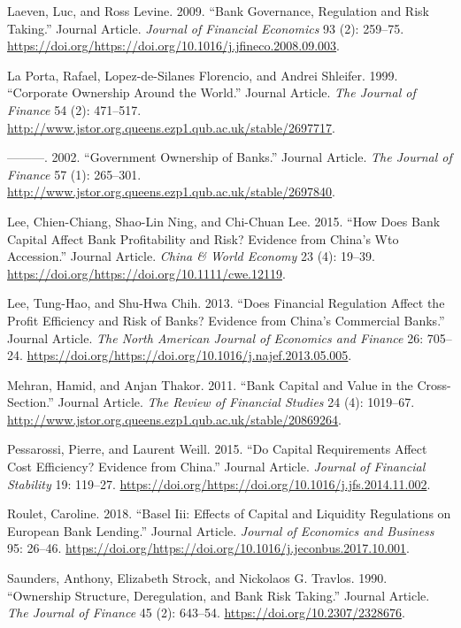 \documentclass{article}
\begin{document}
\leavevmode\hypertarget{ref-RN1}{}%
Laeven, Luc, and Ross Levine. 2009. ``Bank Governance, Regulation and
Risk Taking.'' Journal Article. \emph{Journal of Financial Economics} 93
(2): 259--75.
\url{https://doi.org/https://doi.org/10.1016/j.jfineco.2008.09.003}.

\leavevmode\hypertarget{ref-RN58}{}%
La Porta, Rafael, Lopez-de-Silanes Florencio, and Andrei Shleifer. 1999.
``Corporate Ownership Around the World.'' Journal Article. \emph{The
Journal of Finance} 54 (2): 471--517.
\url{http://www.jstor.org.queens.ezp1.qub.ac.uk/stable/2697717}.

\leavevmode\hypertarget{ref-RN59}{}%
---------. 2002. ``Government Ownership of Banks.'' Journal Article.
\emph{The Journal of Finance} 57 (1): 265--301.
\url{http://www.jstor.org.queens.ezp1.qub.ac.uk/stable/2697840}.

\leavevmode\hypertarget{ref-RN62}{}%
Lee, Chien-Chiang, Shao-Lin Ning, and Chi-Chuan Lee. 2015. ``How Does
Bank Capital Affect Bank Profitability and Risk? Evidence from China's
Wto Accession.'' Journal Article. \emph{China \& World Economy} 23 (4):
19--39. \url{https://doi.org/https://doi.org/10.1111/cwe.12119}.

\leavevmode\hypertarget{ref-RN63}{}%
Lee, Tung-Hao, and Shu-Hwa Chih. 2013. ``Does Financial Regulation
Affect the Profit Efficiency and Risk of Banks? Evidence from China's
Commercial Banks.'' Journal Article. \emph{The North American Journal of
Economics and Finance} 26: 705--24.
\url{https://doi.org/https://doi.org/10.1016/j.najef.2013.05.005}.

\leavevmode\hypertarget{ref-RN64}{}%
Mehran, Hamid, and Anjan Thakor. 2011. ``Bank Capital and Value in the
Cross-Section.'' Journal Article. \emph{The Review of Financial Studies}
24 (4): 1019--67.
\url{http://www.jstor.org.queens.ezp1.qub.ac.uk/stable/20869264}.

\leavevmode\hypertarget{ref-RN66}{}%
Pessarossi, Pierre, and Laurent Weill. 2015. ``Do Capital Requirements
Affect Cost Efficiency? Evidence from China.'' Journal Article.
\emph{Journal of Financial Stability} 19: 119--27.
\url{https://doi.org/https://doi.org/10.1016/j.jfs.2014.11.002}.

\leavevmode\hypertarget{ref-RN68}{}%
Roulet, Caroline. 2018. ``Basel Iii: Effects of Capital and Liquidity
Regulations on European Bank Lending.'' Journal Article. \emph{Journal
of Economics and Business} 95: 26--46.
\url{https://doi.org/https://doi.org/10.1016/j.jeconbus.2017.10.001}.

\leavevmode\hypertarget{ref-RN70}{}%
Saunders, Anthony, Elizabeth Strock, and Nickolaos G. Travlos. 1990.
``Ownership Structure, Deregulation, and Bank Risk Taking.'' Journal
Article. \emph{The Journal of Finance} 45 (2): 643--54.
\url{https://doi.org/10.2307/2328676}.
\end{document}
